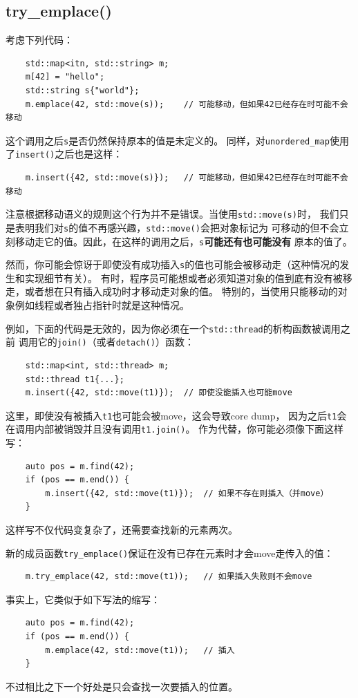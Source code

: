 \subsection{try\_emplace()}
考虑下列代码：
\begin{lstlisting}
    std::map<itn, std::string> m;
    m[42] = "hello";
    std::string s{"world"};
    m.emplace(42, std::move(s));    // 可能移动，但如果42已经存在时可能不会移动
\end{lstlisting}
这个调用之后\texttt{s}是否仍然保持原本的值是未定义的。
同样，对\texttt{unordered\_map}使用了\texttt{insert()}之后也是这样：
\begin{lstlisting}
    m.insert({42, std::move(s)});   // 可能移动，但如果42已经存在时可能不会移动
\end{lstlisting}
注意根据移动语义的规则这个行为并不是错误。当使用\texttt{std::move(s)}时，
我们只是表明我们对\texttt{s}的值不再感兴趣，\texttt{std::move()}会把对象标记为
可移动的但不会立刻移动走它的值。因此，在这样的调用之后，\texttt{s}\textbf{可能还有也可能没有}
原本的值了。

然而，你可能会惊讶于即使没有成功插入\texttt{s}的值也可能会被移动走（这种情况的发生和实现细节有关）。
有时，程序员可能想或者必须知道对象的值到底有没有被移走，或者想在只有插入成功时才移动走对象的值。
特别的，当使用只能移动的对象例如线程或者独占指针时就是这种情况。

例如，下面的代码是无效的，因为你必须在一个\texttt{std::thread}的析构函数被调用之前
调用它的\texttt{join()}（或者\texttt{detach()}）函数：
\begin{lstlisting}
    std::map<int, std::thread> m;
    std::thread t1{...};
    m.insert({42, std::move(t1)});  // 即使没能插入也可能move
\end{lstlisting}
这里，即使没有被插入\texttt{t1}也可能会被move，这会导致core dump，
因为之后\texttt{t1}会在调用内部被销毁并且没有调用\texttt{t1.join()}。
作为代替，你可能必须像下面这样写：
\begin{lstlisting}
    auto pos = m.find(42);
    if (pos == m.end()) {
        m.insert({42, std::move(t1)});  // 如果不存在则插入（并move）
    }
\end{lstlisting}
这样写不仅代码变复杂了，还需要查找新的元素两次。

新的成员函数\texttt{try\_emplace()}保证在没有已存在元素时才会move走传入的值：
\begin{lstlisting}
    m.try_emplace(42, std::move(t1));   // 如果插入失败则不会move
\end{lstlisting}
事实上，它类似于如下写法的缩写：
\begin{lstlisting}
    auto pos = m.find(42);
    if (pos == m.end()) {
        m.emplace(42, std::move(t1));   // 插入
    }
\end{lstlisting}
不过相比之下一个好处是只会查找一次要插入的位置。


